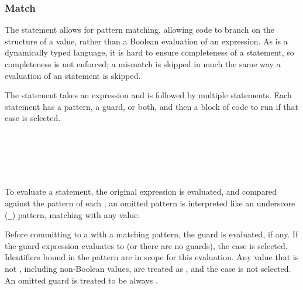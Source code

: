 \subsubsection{Match}

The  statement allows for pattern matching, allowing code to branch
on the structure of a value, rather than a Boolean evaluation of an expression.
As \Trilogy{} is a dynamically typed language, it is hard to ensure completeness
of a  statement, so completeness is not enforced; a mismatch is skipped
in much the same way a  evaluation of an  statement is skipped.

The  statement takes an expression and is followed by multiple 
statements. Each  statement has a pattern, a guard, or both, and then a block
of code to run if that case is selected.

\begin{bnf*}
     \\
     \\
     \\
     \\
\end{bnf*}

To evaluate a  statement, the original expression is evaluated, and compared
against the pattern of each ; an omitted pattern is interpreted like an underscore
(\texttt{\_}) pattern, matching with any value.

Before committing to a  with a matching pattern, the guard is evaluated, if any.
If the guard expression evaluates to  (or there are no guards), the case is selected.
Identifiers bound in the pattern are in scope for this evaluation. Any value that is not ,
including non-Boolean values, are treated as , and the case is not selected. An omitted
guard is treated to be always .

